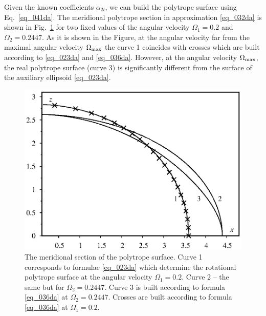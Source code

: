 \documentclass{caosp308}
\begin{document}
Given the known coefficients $\alpha_{2l}$, we can build the polytrope surface using Eq.~\eqref{eq_041da}. The meridional polytrope section in approximation \eqref{eq_032da} is shown in Fig.~\ref{fig_03da} for two fixed values of the angular velocity $\Omega_1=0.2$ and $\Omega_2=0.2447$. As it is shown in the Figure, at the angular velocity far from the maximal angular velocity $\Omega_{\rm max}$ the curve 1 coincides with crosses which are built according to \eqref{eq_023da} and \eqref{eq_036da}. However, at the angular velocity $\Omega_{\rm max}$, the real polytrope surface (curve 3) is significantly different from the surface of the auxiliary ellipsoid \eqref{eq_023da}.

\begin{figure}[h!]
\center\includegraphics[width=.7\textwidth]{fig_03.eps}
\caption{The meridional section of the polytrope surface. Curve 1 corresponds to formulae \eqref{eq_023da} which determine  the rotational polytrope surface at the angular velocity $\Omega_1=0.2$. Curve 2 -- the same but for $\Omega_2=0.2447$. Curve 3 is built according to formula \eqref{eq_036da} at $\Omega_2=0.2447$. Crosses are built according to formula \eqref{eq_036da} at $\Omega_1=0.2$.}
\label{fig_03da}
\end{figure}
\end{document}
